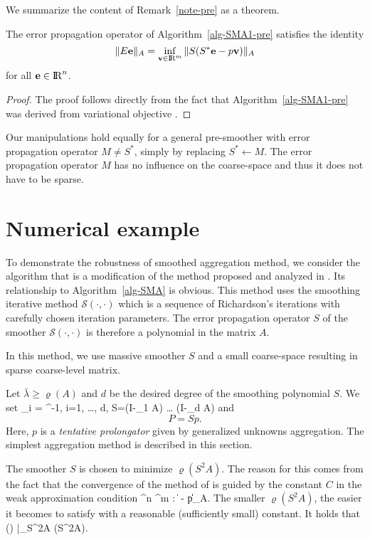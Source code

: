 We summarize the content of Remark~\ref{note-pre} as a theorem.
\begin{theorem}
The error propagation operator  of Algorithm~\ref{alg-SMA1-pre}
satisfies the identity
$$
      \|E{\bf e}\|_A = \inf_{{\bf v} \in {\rm I\negthinspace R}^m} \|S(S^*{\bf e}-p{\bf v})\|_A
$$
for all ${\bf e} \in {\rm I\negthinspace R}^n$.
\end{theorem}
\begin{proof}
The proof follows directly from the fact that Algorithm~\ref{alg-SMA1-pre}
was derived from variational objective .
\end{proof}

\begin{note}
Our manipulations hold equally for a general pre-smoother with error
propagation operator $M \neq S^*$, simply by replacing $S^* \leftarrow M$.
The error propagation operator $M$ has no influence on the coarse-space
and thus it does not have to be sparse.
\end{note}

\section{Numerical example}
To demonstrate the robustness of smoothed aggregation method,
we consider the algorithm that is a modification of
the method proposed and analyzed in \cite{VBT}.
Its relationship to Algorithm~\ref{alg-SMA} is obvious.
This method uses the smoothing iterative method ${\mathcal S}(\cdot,\cdot)$
which is a sequence of Richardson's iterations with carefully chosen
iteration parameters. The error propagation
operator $S$ of the smoother ${\mathcal S}(\cdot,\cdot)$
is therefore a polynomial in the matrix $A$.

In this method, we use massive smoother $S$ and a small coarse-space
resulting in sparse coarse-level matrix.

Let ${\bar \lambda} \geq \varrho(A)$ and $d$ be the desired
degree of the smoothing polynomial $S$. We set
     \alpha_i = ^{-1},
     \quad i=1, \ldots, d,
\qe
{}
   S=\left(I-\alpha_1 A\right) \ldots
     \left(I-\alpha_d A\right)
\qe
and
$$
   P=Sp.
$$
Here, $p$ is a {\em tentative prolongator} given by generalized
unknowns aggregation.
The simplest aggregation method is described in this section.

The smoother $S$ is chosen to minimize $\varrho(S^2A)$. The reason for
this comes from the fact that the convergence of the method of \cite{VBT}
is guided by the constant $C$ in the weak approximation condition
     \forall {} \in \Re^n \; \exists {} \in \Re^m \;:\;
     \| - p\| \leq {}\|\|_A.
\qe
The smaller $\varrho(S^2A)$, the easier it becomes to satisfy  with
a reasonable (sufficiently small) constant.
It holds that (\cite{VBT})
       {\bar \lambda}_{S^2A} \equiv {} \geq
       \varrho(S^2A).
\qe

